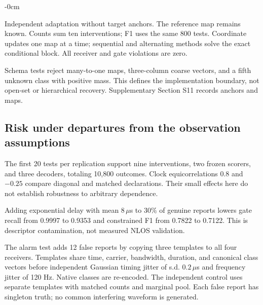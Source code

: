 \begin{table}[!t]\begin{adjustwidth}{-\extralength}{0cm}
\caption{Independent adaptation without target anchors. The reference map remains known. Counts sum ten interventions; F1 uses the same 800 tests. Coordinate updates one map at a time; sequential and alternating methods solve the exact conditional block. All receiver and gate violations are zero.}\label{tab:review_mapping}
\small\setlength{\tabcolsep}{3pt}
\end{adjustwidth}\end{table}


Schema tests reject many-to-one maps, three-column coarse vectors, and a fifth unknown class with positive mass. This defines the implementation boundary, not open-set or hierarchical recovery. Supplementary Section S11 records anchors and maps.




\subsection{Risk under departures from the observation assumptions}\label{sec:risks_revision}
The first 20 tests per replication support nine interventions, two frozen scorers, and three decoders, totaling 10,800 outcomes. Clock equicorrelations 0.8 and $-0.25$ compare diagonal and matched declarations. Their small effects here do not establish robustness to arbitrary dependence.

Adding exponential delay with mean $8\,\mu$s to 30\% of genuine reports lowers gate recall from 0.9997 to 0.9353 and constrained F1 from 0.7822 to 0.7122. This is descriptor contamination, not measured NLOS validation.

The alarm test adds 12 false reports by copying three templates to all four receivers. Templates share time, carrier, bandwidth, duration, and canonical class vectors before independent Gaussian timing jitter of s.d. $0.2\,\mu$s and frequency jitter of 120 Hz. Native classes are re-encoded. The independent control uses separate templates with matched counts and marginal pool. Each false report has singleton truth; no common interfering waveform is generated.

